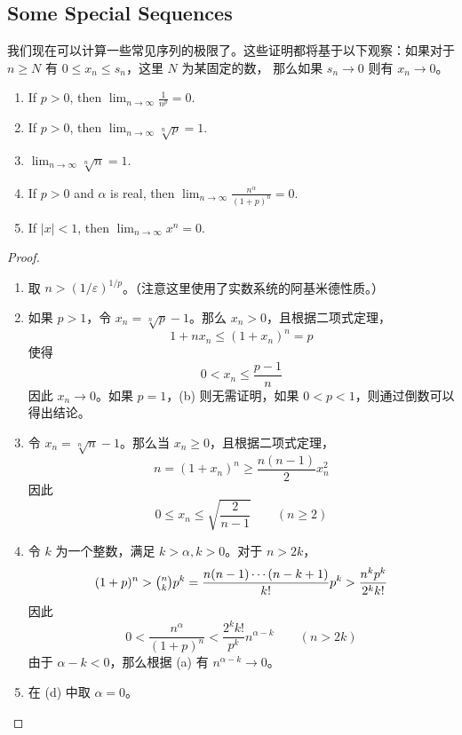 \documentclass[../poma-notes.tex]{subfiles}
\begin{document}
\subsection*{Some Special Sequences}

我们现在可以计算一些常见序列的极限了。这些证明都将基于以下观察：如果对于 $n \ge N$ 有 $0 \le x_n \le s_n$，这里 $N$ 为某固定的数，
那么如果 $s_n \to 0$ 则有 $x_n \to 0$。

\begin{theorem}\mbox{}
  \begin{enumerate}[label=(\alph*)]
    \item If $p > 0$, then $\lim_{n \to \infty} \frac{1}{n^p} = 0$.
    \item If $p > 0$, then $\lim_{n \to \infty} \sqrt[n]{p} = 1$.
    \item $\lim_{n \to \infty} \sqrt[n]{n} = 1$.
    \item If $p > 0$ and $\alpha$ is real, then $\lim_{n \to \infty} \frac{n^{\alpha}}{(1 + p)^n} = 0$.
    \item If $|x| < 1$, then $\lim_{n \to \infty} x^n = 0$.
  \end{enumerate}
\end{theorem}

\begin{proof}
  \begin{enumerate}[label=(\alph*)]
    \item 取 $n > (1/\varepsilon)^{1/p}$。（注意这里使用了实数系统的阿基米德性质。）
    \item 如果 $p > 1$，令 $x_n = \sqrt[n]{p} - 1$。那么 $x_n > 0$，且根据二项式定理，
          \[ 1 + nx_n \le (1 + x_n)^n = p \]
          使得
          \[ 0 < x_n \le \frac{p-1}{n} \]
          因此 $x_n \to 0$。如果 $p = 1$，(b) 则无需证明，如果 $0 < p < 1$，则通过倒数可以得出结论。
    \item 令 $x_n = \sqrt[n]{n} - 1$。那么当 $x_n \ge 0$，且根据二项式定理，
          \[ n = (1 + x_n)^n \ge \frac{n(n-1)}{2} x_n^2 \]
          因此
          \[ 0 \le x_n \le \sqrt{\frac{2}{n-1}} \qquad (n \ge 2) \]
    \item 令 $k$ 为一个整数，满足 $k > \alpha, k > 0$。对于 $n > 2k$，
          \[ (1+p)^n>\tbinom{n}{k}p^k=\frac{n(n-1)\cdots(n-k+1)}{k!}p^k>\frac{n^kp^k}{2^kk!}  \]
          因此
          \[ 0 < \frac{n^{\alpha}}{(1+p)^n} < \frac{2^kk!}{p^k} n^{\alpha-k} \qquad (n>2k)\]
          由于 $\alpha - k < 0$，那么根据 (a) 有 $n^{\alpha-k} \to 0$。
    \item 在 (d) 中取 $\alpha = 0$。
  \end{enumerate}
\end{proof}
\end{document}
